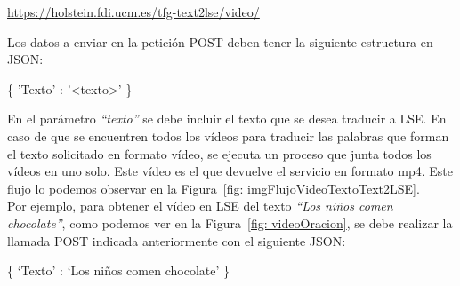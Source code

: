 \begin{shaded}
	\url{https://holstein.fdi.ucm.es/tfg-text2lse/video/  }	
\end{shaded}


Los datos a enviar en la petición POST deben tener la siguiente estructura en JSON: 
\begin{center}

		\{ 'Texto' : '<texto>' \}

\end{center}


En el parámetro \textit{``texto''} se debe incluir el texto que se desea traducir a LSE. En caso de que se encuentren todos los vídeos para traducir las palabras que forman el texto solicitado en formato vídeo, se ejecuta un proceso que junta todos los vídeos en uno solo. Este vídeo es el que devuelve el servicio en formato mp4. Este flujo lo podemos observar en la Figura~\ref {fig: imgFlujoVideoTextoText2LSE}.\\

Por ejemplo, para obtener el vídeo en LSE del texto \textit{``Los niños comen chocolate''}, como podemos ver en la Figura~\ref {fig: videoOracion}, se debe realizar la llamada POST indicada anteriormente con el siguiente JSON:

\begin{center}
	
	\{ `Texto' : `Los niños comen chocolate' \}
	
\end{center}


